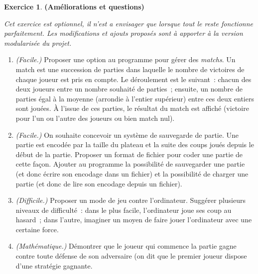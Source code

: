 \documentclass[12pt]{article}
\theoremstyle{definition}
\newtheorem{Exercice}{Exercice}
\begin{document}
\begin{Exercice} {\bf (Améliorations et questions)}\smallskip

{\it Cet exercice est optionnel, il n'est a envisager que lorsque
tout le reste fonctionne parfaitement. Les modifications et ajouts
proposés sont à apporter à la version modularisée du projet.}
\smallskip

\begin{enumerate}
    \item {\it (Facile.)} Proposer une option au programme pour gérer 
    des {\em matchs}. Un match est une succession de parties dans 
    laquelle le nombre de victoires de chaque joueur est pris en compte. 
    Le déroulement est le suivant~: chacun des deux joueurs entre un 
    nombre souhaité de parties~; ensuite, un nombre de parties égal à la 
    moyenne (arrondie à l'entier supérieur) entre ces deux entiers sont 
    jouées. À l'issue de ces parties, le résultat du match est affiché
    (victoire pour l'un ou l'autre des joueurs ou bien match nul).
    \smallskip

    \item {\it (Facile.)} On souhaite concevoir un système de sauvegarde 
    de partie. Une partie est encodée par la taille du plateau et la suite 
    des coups joués depuis le début de la partie. Proposer un format de 
    fichier pour coder une partie de cette façon. Ajouter au programme 
    la possibilité de sauvegarder une partie (et donc écrire son encodage 
    dans un fichier) et la possibilité de charger une partie (et donc de 
    lire son encodage depuis un fichier).
    \smallskip

    \item {\it (Difficile.)} Proposer un mode de jeu contre l'ordinateur. 
    Suggérer plusieurs niveaux de difficulté~: dans le plus facile, 
    l'ordinateur joue ses coup au hasard~; dans l'autre, imaginer un moyen 
    de faire jouer l'ordinateur avec une certaine force.
    \smallskip
    
    \item {\it (Mathématique.)} Démontrer que le joueur qui commence la
    partie gagne contre toute défense de son adversaire (on dit que 
    le premier joueur dispose d'une \og stratégie gagnante\fg.
\end{enumerate}
\end{Exercice}
\bigskip
\end{document}

